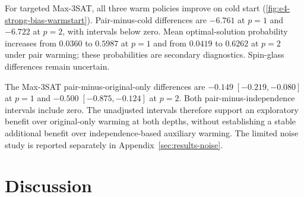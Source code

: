 \documentclass[a4paper,onecolumn,11pt,unpublished]{quantumarticle}
\theoremstyle{remark}
\begin{document}
\begin{table}[!htbp]
\centering\small
\caption{Coordinate-corrected warm-start results on the 20 strongest-screened instances. Entries are mean paired original-objective differences with exploratory, unadjusted 95\% Student-$t$ intervals across ten raw instances per family, after averaging three restarts. Negative values favour the first policy named.}
\label{tab:e4-strong-bias-warmstart}
\end{table}

For targeted Max-3SAT, all three warm policies improve on cold start
(\cref{fig:e4-strong-bias-warmstart}). Pair-minus-cold differences are
$-6.761$ at $p=1$ and $-6.722$ at $p=2$, with intervals below zero.
Mean optimal-solution probability increases from $0.0360$ to $0.5987$
at $p=1$ and from $0.0419$ to $0.6262$ at $p=2$ under pair warming;
these probabilities are secondary diagnostics. Spin-glass differences
remain uncertain.

The Max-3SAT pair-minus-original-only differences are
$-0.149\;[-0.219,-0.080]$ at $p=1$ and
$-0.500\;[-0.875,-0.124]$ at $p=2$.
Both pair-minus-independence intervals include zero. The unadjusted
intervals therefore support an exploratory benefit over
original-only warming at both depths, without establishing a stable
additional benefit over independence-based auxiliary warming.
The limited noise study is reported separately in
Appendix~\ref{sec:results-noise}.

\FloatBarrier

\section{Discussion}
\label{sec:discussion}
\label{sec:conclusion}
\label{sec:discussion-search-scope}
\end{document}
